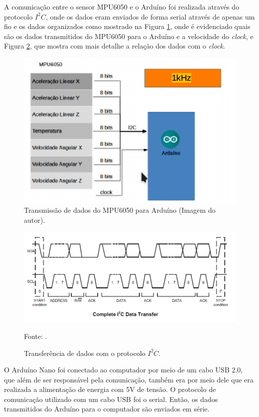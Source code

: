 		A comunicação entre o sensor MPU6050 e o Arduíno foi realizada através do protocolo $I^2C$, onde os dados eram enviados de forma serial através de apenas um fio e os dados organizados como mostrado na Figura \ref{comunicacao}, onde é evidenciado quais são os dados transmitidos do MPU6050 para o Arduíno e a velocidade do \textit{clock}, e Figura \ref{i2c}, que mostra com mais detalhe a relação dos dados com o \textit{clock}.
		
		\begin{figure}[h!]
			\centering
			\includegraphics[keepaspectratio=true,scale=1]{figuras/comunicacao.PNG}
			\caption{ Transmissão de dados do MPU6050 para Arduíno (Imagem do autor).}
		 
			\label{comunicacao}	
		\end{figure}
		
		\begin{figure}[h!]
			\centering
			\includegraphics[keepaspectratio=true,scale=0.5]{figuras/i2c.PNG}
			\caption{Transferência de dados com o protocolo $I^2C$. }
			Fonte: \cite{mpu6050}. 
			\label{i2c}	
		\end{figure}
	
		O Arduíno Nano foi conectado ao computador por meio de um cabo USB 2.0, que além de ser responsável pela comunicação, também era por meio dele que era realizada a alimentação de energia com 5V de tensão. O protocolo de comunicação utilizado com um cabo USB  foi o serial. Então, os dados transmitidos do Arduíno para o computador são enviados em série. 
		
